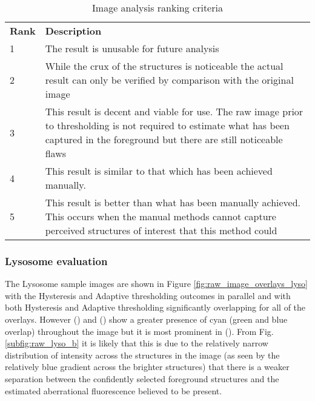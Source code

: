 \begin{table}[h!]
    \centering
    \begin{tabularx}{\linewidth}{|l|X|}
         \textbf{Rank}& \textbf{Description}\\
         1& The result is unusable for future analysis\\
         2& While the crux of the structures is noticeable the actual result can only be verified by comparison with the original image\\
         3& This result is decent and viable for use. The raw image prior to thresholding is not required to estimate what has been captured in the foreground but there are still noticeable flaws\\
         4& This result is similar to that which has been achieved manually.\\
         5& This result is better than what has been manually achieved. This occurs when the manual methods cannot capture perceived structures of interest that this method could\\
    \end{tabularx}
    \caption{Image analysis ranking criteria}
    \label{tab:image_analysis_rankings}
\end{table}

\subsubsection{Lysosome evaluation}
The Lysosome sample images are shown in Figure \ref{fig:raw_image_overlays_lyso} with the Hysteresis and Adaptive thresholding outcomes in parallel and with both Hysteresis and Adaptive thresholding significantly overlapping for all of the overlays. However () and () show a greater presence of cyan (green and blue overlap) throughout the image but it is most prominent in (). From Fig. \ref{subfig:raw_lyso_b} it is likely that this is due to the relatively narrow distribution of intensity across the structures in the image (as seen by the relatively blue gradient across the brighter structures) that there is a weaker separation between the confidently selected foreground structures and the estimated aberrational fluorescence believed to be present.

